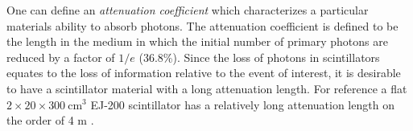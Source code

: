 {%

One can define an  \textit{attenuation coefficient} which characterizes a particular materials ability to absorb photons. The attenuation coefficient is defined to be the length in the medium in which the initial number of primary  photons are reduced by a factor of $1/e$ (36.8\%).  Since the loss of photons in scintillators equates to the loss of information relative to the event of interest, it is desirable to have a scintillator material with a long attenuation length.  For reference a flat $2 \times 20 \times 300\ \mathrm{cm^{3}}$ EJ-200 scintillator has a relatively long attenuation length on the order of 4 m \cite{ej200_specs}.

}

